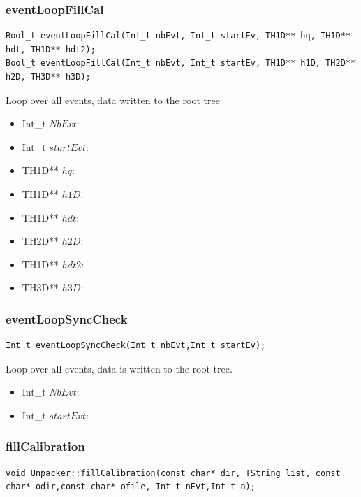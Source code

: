 \documentclass[a4paper]{book}
\begin{document}
\subsubsection{eventLoopFillCal}

\begin{lstlisting}[style=customc]
Bool_t eventLoopFillCal(Int_t nbEvt, Int_t startEv, TH1D** hq, TH1D** hdt, TH1D** hdt2);
Bool_t eventLoopFillCal(Int_t nbEvt, Int_t startEv, TH1D** h1D, TH2D** h2D, TH3D** h3D);
\end{lstlisting}

Loop over all events, data written to the root tree

\begin{itemize}
	\item Int\_t $NbEvt$: 
	\item Int\_t $startEvt$: 
	\item TH1D** $hq$: 
	\item TH1D** $h1D$: 
	\item TH1D** $hdt$: 
	\item TH2D** $h2D$: 
	\item TH1D** $hdt2$: 
	\item TH3D** $h3D$: 
\end{itemize}

\subsubsection{eventLoopSyncCheck}

\begin{lstlisting}[style=customc]
Int_t eventLoopSyncCheck(Int_t nbEvt,Int_t startEv);
\end{lstlisting}

Loop over all events, data is written to the root tree.

\begin{itemize}
	\item Int\_t $NbEvt$: 
	\item Int\_t $startEvt$: 
\end{itemize}

\subsubsection{fillCalibration}

\begin{lstlisting}[style=customc]
void Unpacker::fillCalibration(const char* dir, TString list, const char* odir,const char* ofile, Int_t nEvt,Int_t n);
\end{lstlisting}
\end{document}

